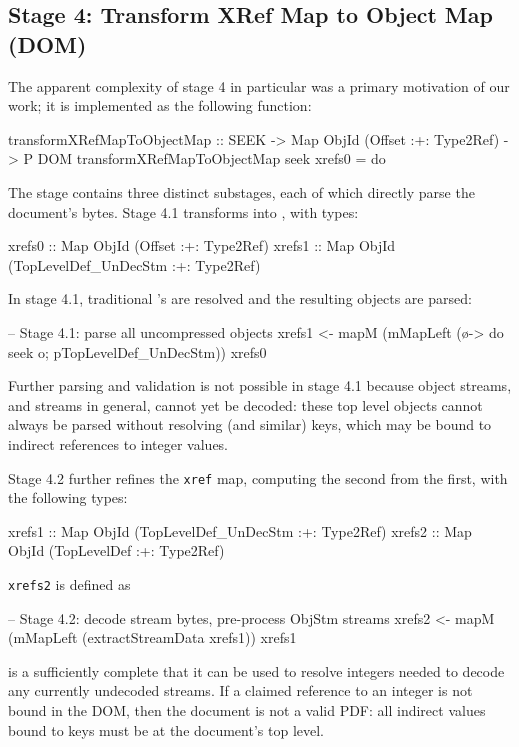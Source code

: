 \subsection{Stage 4: Transform XRef Map to Object Map (DOM)}
\label{sec:stage-4}
%
The apparent complexity of stage 4 in particular was a primary motivation of our work;
%
it is implemented as the following function:
\begin{code}
transformXRefMapToObjectMap
  :: SEEK -> Map ObjId (Offset :+: Type2Ref) -> P DOM
transformXRefMapToObjectMap seek xrefs0 = do
\end{code}
%
The stage contains three distinct substages, each of which directly parse the document's bytes.
%
Stage 4.1 transforms  into , with types:
\begin{codeNoExecute}
  xrefs0 :: Map ObjId (Offset               :+: Type2Ref) 
  xrefs1 :: Map ObjId (TopLevelDef_UnDecStm :+: Type2Ref)
\end{codeNoExecute}
%
In stage 4.1, traditional 's are resolved and the resulting objects are parsed:
\begin{code}
    -- Stage 4.1: parse all uncompressed objects
    xrefs1 <- mapM
                (mMapLeft (\o-> do {seek o; pTopLevelDef_UnDecStm}))
                xrefs0
\end{code}
Further parsing and validation is not possible in stage 4.1 because object streams, and streams in general, cannot yet be decoded: these top level objects cannot always be parsed without resolving  (and similar) keys, which may be bound to indirect references to integer values.

Stage 4.2 further refines the \texttt{xref} map, computing the second from the first, with the following types:
\begin{codeNoExecute}
  xrefs1 :: Map ObjId (TopLevelDef_UnDecStm :+: Type2Ref)
  xrefs2 :: Map ObjId (TopLevelDef          :+: Type2Ref) 
\end{codeNoExecute}
\texttt{xrefs2} is defined as
\begin{code}
    -- Stage 4.2: decode stream bytes, pre-process ObjStm streams
    xrefs2 <- mapM
                (mMapLeft (extractStreamData xrefs1))
                xrefs1
\end{code}
%
 is a sufficiently complete  that it can be used to resolve integers needed to decode any currently undecoded streams.
%
If a claimed reference to an integer is not bound in the DOM, then the document is not a valid PDF: all indirect values bound to  keys must be at the document's top level.

